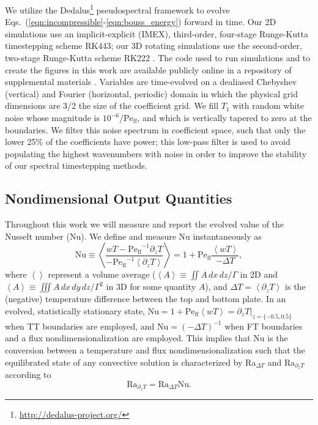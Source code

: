 \documentclass[aps, pre, onecolumn, nofootinbib, notitlepage, groupedaddress, amsfonts, amssymb, amsmath, longbibliography, superscriptaddress]{revtex4-1}
\newcommand{\angles}[1]{\ensuremath{\left\langle #1 \right\rangle}}
\newcommand{\Peff}{\ensuremath{\text{Pe}_{\text{ff}}}}
\begin{document}
We utilize the Dedalus\footnote{\url{http://dedalus-project.org/}} pseudospectral framework \cite{burns&all2016, burns&all2019} to evolve Eqs.~(\ref{eqn:incompressible}-\ref{eqn:bouss_energy}) forward in time.
Our 2D simulations use an implicit-explicit (IMEX), third-order, four-stage Runge-Kutta timestepping scheme RK443; our 3D rotating simulations use the second-order, two-stage Runge-Kutta scheme RK222 \cite{ascher&all1997}. 
The code used to run simulations and to create the figures in this work are available publicly online in a repository of supplemental materials \cite{anders&all2020a_supp}.
Variables are time-evolved on a dealiased Chebyshev (vertical) and Fourier (horizontal, periodic) domain in which the physical grid dimensions are 3/2 the size of the coefficient grid.  
We fill $T_1$ with random white noise whose magnitude is $10^{-6}/\Peff$, and which is vertically tapered to zero at the boundaries.
We filter this noise spectrum in coefficient space, such that only the lower 25\% of the coefficients have power; this low-pass filter is used to avoid populating the highest wavenumbers with noise in order to improve the stability of our spectral timestepping methods.


\subsection{Nondimensional Output Quantities}
\label{sec:ra_nu_relations}
Throughout this work we will measure and report the evolved value of the Nusselt number (Nu).
We define and measure Nu instantaneously as
\begin{equation}
\text{Nu} \equiv \angles{\frac{w T - \Peff^{-1} \partial_z T}{-\Peff^{-1} \angles{\partial_z T}}}
= 1 + \Peff\frac{\angles{w T}}{-\Delta T},
\end{equation}
where $\angles{}$ represent a volume average ($\angles{A} \equiv \iint A\,dx\,dz / \Gamma$ in 2D and $\angles{A} \equiv \iiint A\,dx\,dy\,dz / \Gamma^2$ in 3D for some quantity $A$), and $\Delta T = \angles{\partial_z T}$ is the (negative) temperature difference between the top and bottom plate.
In an evolved, statistically stationary state, $\left.\text{Nu} = 1 + \Peff\angles{wT} = \partial_z T\right|_{z = \{-0.5, 0.5\}}$ when TT boundaries are employed, and $\text{Nu} = (-\Delta T)^{-1}$ when FT boundaries and a flux nondimensionalization are employed.
This implies that Nu is the conversion between a temperature and flux nondimensionalization such that the equilibrated state of any convective solution is characterized by Ra$_{\Delta T}$ and Ra$_{\partial_z T}$ according to
\begin{equation}
\text{Ra}_{\partial_z T} = \text{Ra}_{\Delta T} \text{Nu}.
\label{eqn:ra_relation}
\end{equation}
\end{document}
